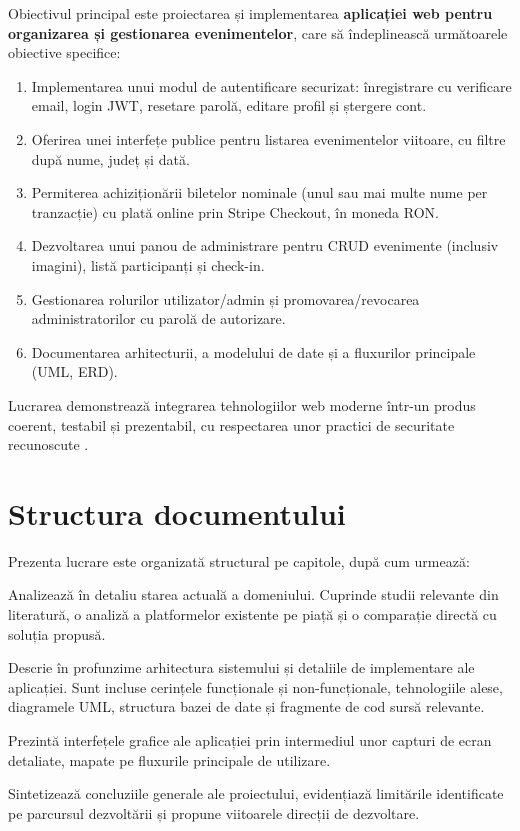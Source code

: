 Obiectivul principal este proiectarea și implementarea \textbf{aplicației web pentru organizarea și gestionarea evenimentelor}, care să îndeplinească următoarele obiective specifice:

\begin{enumerate}
	\item Implementarea unui modul de autentificare securizat: înregistrare cu verificare email, login JWT, resetare parolă, editare profil și ștergere cont.
	\item Oferirea unei interfețe publice pentru listarea evenimentelor viitoare, cu filtre după nume, județ și dată.
	\item Permiterea achiziționării biletelor nominale (unul sau mai multe nume per tranzacție) cu plată online prin Stripe Checkout, în moneda RON.
	\item Dezvoltarea unui panou de administrare pentru CRUD evenimente (inclusiv imagini), listă participanți și check-in.
	\item Gestionarea rolurilor utilizator/admin și promovarea/revocarea administratorilor cu parolă de autorizare.
	\item Documentarea arhitecturii, a modelului de date și a fluxurilor principale (UML, ERD).
\end{enumerate}

Lucrarea demonstrează integrarea tehnologiilor web moderne într-un produs coerent, testabil și prezentabil, cu respectarea unor practici de securitate recunoscute \cite{rfc7519, fowler2002}.


\section{Structura documentului}

Prezenta lucrare este organizată structural pe capitole, după cum urmează:

\vspace{0.2cm}
\begin{description}
	\setlength{\itemsep}{0.3cm}
	\item[Capitolul 2] Analizează în detaliu starea actuală a domeniului. Cuprinde studii relevante din literatură, o analiză a platformelor existente pe piață și o comparație directă cu soluția propusă.
	\item[Capitolul 3] Descrie în profunzime arhitectura sistemului și detaliile de implementare ale aplicației. Sunt incluse cerințele funcționale și non-funcționale, tehnologiile alese, diagramele UML, structura bazei de date și fragmente de cod sursă relevante.
	\item[Capitolul 4] Prezintă interfețele grafice ale aplicației prin intermediul unor capturi de ecran detaliate, mapate pe fluxurile principale de utilizare.
	\item[Capitolul 5] Sintetizează concluziile generale ale proiectului, evidențiază limitările identificate pe parcursul dezvoltării și propune viitoarele direcții de dezvoltare.
\end{description}


